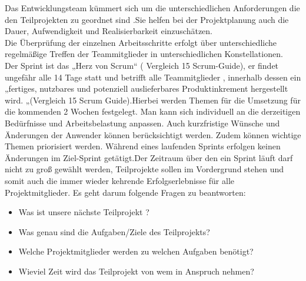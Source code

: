 \documentclass[a4paper, 10pt]{scrartcl}
\begin{document}
Das Entwicklungsteam kümmert sich um die unterschiedlichen Anforderungen die den Teilprojekten zu geordnet sind .Sie helfen bei der Projektplanung auch die Dauer, Aufwendigkeit und Realisierbarkeit einzuschätzen.\\
Die Überprüfung der einzelnen Arbeitsschritte erfolgt über unterschiedliche regelmäßige Treffen der Teammitglieder in unterschiedlichen Konstellationen.\\
Der Sprint ist das „Herz von Scrum“ ( Vergleich 15 Scrum-Guide), er findet ungefähr alle 14 Tage statt und betrifft alle Teammitglieder , innerhalb dessen ein „fertiges, nutzbares und potenziell auslieferbares Produktinkrement hergestellt wird. „(Vergleich 15 Scrum Guide).Hierbei werden Themen für die Umsetzung für die kommenden 2 Wochen festgelegt. Man kann sich individuell an die derzeitigen Bedürfnisse und Arbeitsbelastung anpassen. Auch kurzfristige Wünsche und Änderungen der Anwender können berücksichtigt werden. Zudem können wichtige Themen priorisiert werden. Während eines laufenden Sprints erfolgen keinen Änderungen im Ziel-Sprint getätigt.Der Zeitraum über den ein Sprint läuft darf nicht zu groß gewählt werden, Teilprojekte sollen im Vordergrund stehen und somit auch die immer wieder kehrende Erfolgserlebnisse für alle Projektmitglieder.
Es geht darum folgende Fragen zu beantworten:

\begin{itemize}
\item Was ist unsere nächste Teilprojekt ?
\item Was genau sind die Aufgaben/Ziele des Teilprojekts?
\item Welche Projektmitglieder werden zu welchen Aufgaben benötigt?
\item Wieviel Zeit wird das Teilprojekt von wem in Anspruch nehmen?
\end{itemize}
\end{document}
